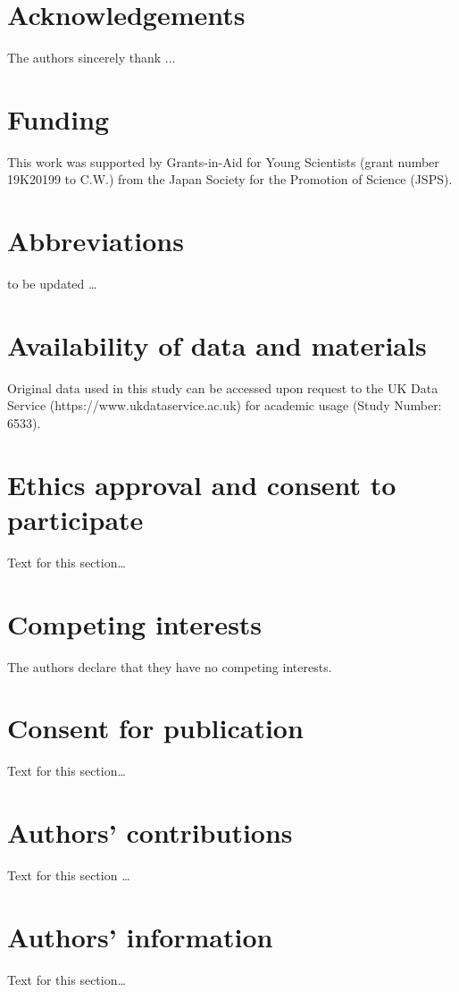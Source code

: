 \documentclass{bmcart}
\begin{document}
\begin{backmatter}

\section*{Acknowledgements}%
The authors sincerely thank ...

\section*{Funding}%
This work was supported by Grants-in-Aid for Young Scientists (grant number 19K20199 to C.W.) from the Japan Society for the Promotion of Science (JSPS).

\section*{Abbreviations}%
to be updated \ldots

\section*{Availability of data and materials}%
Original data used in this study can be accessed upon request to the UK Data Service (https://www.ukdataservice.ac.uk) for academic usage (Study Number: 6533).

\section*{Ethics approval and consent to participate}%
Text for this section\ldots

\section*{Competing interests}
The authors declare that they have no competing interests.

\section*{Consent for publication}%
Text for this section\ldots

\section*{Authors' contributions}
Text for this section \ldots

\section*{Authors' information}%
Text for this section\ldots


\end{backmatter}
\end{document}
